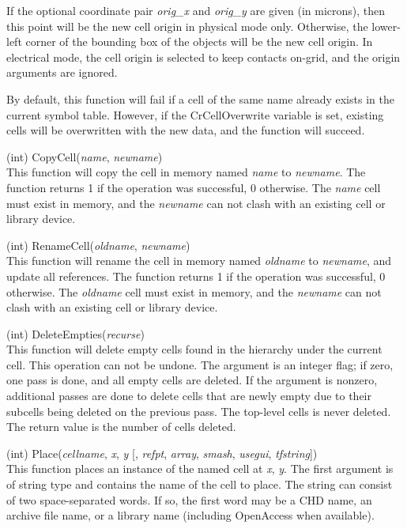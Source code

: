 \begin{description}
If the optional coordinate pair {\it orig\_x} and {\it orig\_y} are
given (in microns), then this point will be the new cell origin in
physical mode only.  Otherwise, the lower-left corner of the bounding
box of the objects will be the new cell origin.  In electrical mode,
the cell origin is selected to keep contacts on-grid, and the origin
arguments are ignored.

By default, this function will fail if a cell of the same name already
exists in the current symbol table.  However, if the {\et
CrCellOverwrite} variable is set, existing cells will be overwritten
with the new data, and the function will succeed.

\item{(int) \vt CopyCell({\it name\/}, {\it newname\/})}\\
This function will copy the cell in memory named {\it name} to {\it
newname}.  The function returns 1 if the operation was successful, 0
otherwise.  The {\it name} cell must exist in memory, and the {\it
newname} can not clash with an existing cell or library device.

\item{(int) \vt RenameCell({\it oldname\/}, {\it newname\/})}\\
This function will rename the cell in memory named {\it oldname} to
{\it newname\/}, and update all references.  The function returns 1 if
the operation was successful, 0 otherwise.  The {\it oldname} cell
must exist in memory, and the {\it newname} can not clash with an
existing cell or library device.

\item{(int) \vt DeleteEmpties({\it recurse\/})}\\
This function will delete empty cells found in the hierarchy under the
current cell.  This operation can not be undone.  The argument is an
integer flag; if zero, one pass is done, and all empty cells are
deleted.  If the argument is nonzero, additional passes are done to
delete cells that are newly empty due to their subcells being deleted
on the previous pass.  The top-level cells is never deleted.  The
return value is the number of cells deleted.

\item{(int) \vt Place({\it cellname\/}, {\it x\/}, {\it y\/} [, {\it refpt\/},
  {\it array\/}, {\it smash\/}, {\it usegui\/}, {\it tfstring\/}])}\\
This function places an instance of the named cell at {\it x\/}, {\it
y\/}.  The first argument is of string type and contains the name of
the cell to place.  The string can consist of two space-separated
words.  If so, the first word may be a CHD name, an archive file name,
or a library
name (including OpenAccess when available).


\end{description}
